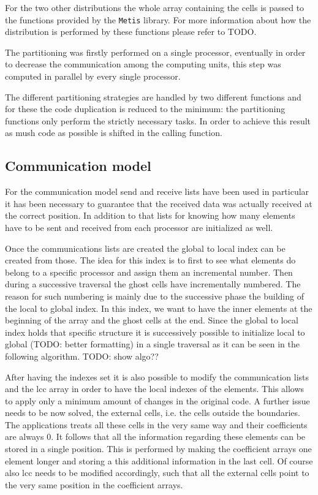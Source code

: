 \documentclass[12pt, a4paper]{article}
\begin{document}
  For the two other distributions the whole array containing the cells is passed
  to the functions provided by the \verb=Metis= library. For more information 
  about how the distribution is performed by these functions please refer to TODO.

  The partitioning was firstly performed on a single processor, eventually in
  order to decrease the communication among the computing units, this step was
  computed in parallel by every single processor.

  The different partitioning strategies are handled by two different functions
  and for these the code duplication is reduced to the minimum: the partitioning
  functions only perform the strictly necessary tasks. In order to achieve this
  result as mush code as possible is shifted in the calling function.

  \subsection*{Communication model}
  For the communication model send and receive lists have been used in
  particular it has been necessary to guarantee that the received data was
  actually received at the correct position. In addition to that lists for
  knowing how many elements have to be sent and received from each processor are
  initialized as well.

  Once the communications lists are created the global to local index can be
  created from those. The idea for this index is to first to see what elements
  do belong to a specific processor and assign them an incremental number. Then
  during a successive traversal the ghost cells have incrementally numbered.
  The reason for such numbering is mainly due to the successive phase the
  building of the local to global index. In this index, we want to have the
  inner elements at the beginning of the array and the ghost cells at the end.
  Since the global to local index holds that specific structure it is
  successively possible to initialize local to global (TODO: better formatting)
  in a single traversal as it can be seen in the following algorithm.
  TODO: show algo??

  After having the indexes set it is also possible to modify the communication 
  lists and the lcc array in order to have the local indexes of the elements. 
  This allows to apply only a minimum amount of changes in the original code.
  A further issue needs to be now solved, the external cells, i.e. the cells
  outside the boundaries. The applications treats all these cells in the very
  same way and their coefficients are always $0$. It follows that all the
  information regarding these elements can be stored in a single position. This
  is performed by making the coefficient arrays one element longer and storing a
  this additional information in the last cell. Of course also lcc needs to be
  modified accordingly, such that all the external cells point to the very same
  position in the coefficient arrays.
\end{document}
